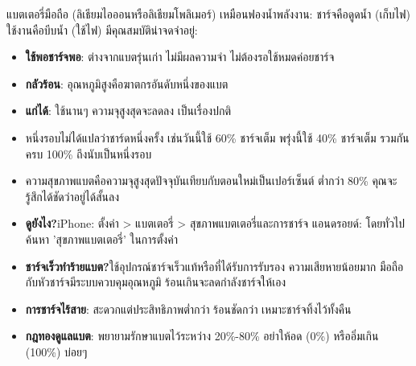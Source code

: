 


แบตเตอรี่มือถือ (ลิเธียมไอออนหรือลิเธียมโพลิเมอร์) เหมือนฟองน้ำพลังงาน: ชาร์จคือดูดน้ำ (เก็บไฟ) ใช้งานคือบีบน้ำ (ใช้ไฟ) มีคุณสมบัติน่าจดจำอยู่:

\begin{itemize}
  \item \textbf{ใช้พอชาร์จพอ}: ต่างจากแบตรุ่นเก่า ไม่มีผลความจำ ไม่ต้องรอใช้หมดค่อยชาร์จ
  \item \textbf{กลัวร้อน}: อุณหภูมิสูงคือฆาตกรอันดับหนึ่งของแบต
  \item \textbf{แก่ได้}: ใช้นานๆ ความจุสูงสุดจะลดลง เป็นเรื่องปกติ
\end{itemize}


\begin{itemize}
  \item หนึ่งรอบไม่ได้แปลว่าชาร์ดหนึ่งครั้ง เช่นวันนี้ใช้ 60\% ชาร์จเต็ม พรุ่งนี้ใช้ 40\% ชาร์จเต็ม รวมกันครบ 100\% ถึงนับเป็นหนึ่งรอบ
  \item ความสุขภาพแบตคือความจุสูงสุดปัจจุบันเทียบกับตอนใหม่เป็นเปอร์เซ็นต์ ต่ำกว่า 80\% คุณจะรู้สึกได้ชัดว่าอยู่ได้สั้นลง
  \item \textbf{ดูยังไง?}iPhone: ตั้งค่า > แบตเตอรี่ > สุขภาพแบตเตอรี่และการชาร์จ แอนดรอยด์: โดยทั่วไปค้นหา 'สุขภาพแบตเตอรี่' ในการตั้งค่า
\end{itemize}


\begin{itemize}
  \item \textbf{ชาร์จเร็วทำร้ายแบต?}ใช้อุปกรณ์ชาร์จเร็วแท้หรือที่ได้รับการรับรอง ความเสียหายน้อยมาก มือถือกับหัวชาร์จมีระบบควบคุมอุณหภูมิ ร้อนเกินจะลดกำลังชาร์จให้เอง
  \item \textbf{การชาร์จไร้สาย}: สะดวกแต่ประสิทธิภาพต่ำกว่า ร้อนชัดกว่า เหมาะชาร์จทิ้งไว้ทั้งคืน
  \item \textbf{กฎทองดูแลแบต}: พยายามรักษาแบตไว้ระหว่าง 20\%-80\% อย่าให้อด (0\%) หรืออิ่มเกิน (100\%) บ่อยๆ
\end{itemize}

